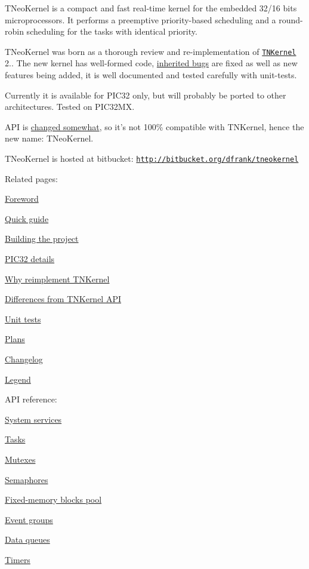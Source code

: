 T\+Neo\+Kernel is a compact and fast real-\/time kernel for the embedded 32/16 bits microprocessors. It performs a preemptive priority-\/based scheduling and a round-\/robin scheduling for the tasks with identical priority.

T\+Neo\+Kernel was born as a thorough review and re-\/implementation of \href{http://tnkernel.com}{\tt T\+N\+Kernel} 2.. The new kernel has well-\/formed code, \hyperlink{why_reimplement_why_reimplement__bugs}{inherited bugs} are fixed as well as new features being added, it is well documented and tested carefully with unit-\/tests.

Currently it is available for P\+I\+C32 only, but will probably be ported to other architectures. Tested on P\+I\+C32\+M\+X.

A\+P\+I is \hyperlink{tnkernel_diff}{changed somewhat}, so it's not 100\% compatible with T\+N\+Kernel, hence the new name\+: T\+Neo\+Kernel.

T\+Neo\+Kernel is hosted at bitbucket\+: \href{http://bitbucket.org/dfrank/tneokernel}{\tt http\+://bitbucket.\+org/dfrank/tneokernel}

Related pages\+:


\begin{DoxyItemize}
\item \hyperlink{foreword}{Foreword}
\item \hyperlink{quick_guide}{Quick guide}
\item \hyperlink{building}{Building the project}
\item \hyperlink{pic32_details}{P\+I\+C32 details}
\item \hyperlink{why_reimplement}{Why reimplement T\+N\+Kernel}
\item \hyperlink{tnkernel_diff}{Differences from T\+N\+Kernel A\+P\+I}
\item \hyperlink{unit_tests}{Unit tests}
\item \hyperlink{plans}{Plans}
\item \hyperlink{changelog}{Changelog}
\item \hyperlink{legend}{Legend}
\end{DoxyItemize}

A\+P\+I reference\+:


\begin{DoxyItemize}
\item \hyperlink{tn__sys_8h}{System services}
\item \hyperlink{tn__tasks_8h}{Tasks}
\item \hyperlink{tn__mutex_8h}{Mutexes}
\item \hyperlink{tn__sem_8h}{Semaphores}
\item \hyperlink{tn__fmem_8h}{Fixed-\/memory blocks pool}
\item \hyperlink{tn__eventgrp_8h}{Event groups}
\item \hyperlink{tn__dqueue_8h}{Data queues}
\item \hyperlink{tn__timer_8h}{Timers} 
\end{DoxyItemize}